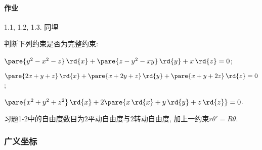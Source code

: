 \documentclass[../LectureNotes.tex]{subfiles}
\begin{document}

\paragraph{作业} %
\label{par:作业}

1.1, 1.2, 1.3. 同埋
\begin{ex}
    判断下列约束是否为完整约束:
    \begin{cenum}
        \item $\pare{y^2-x^2-z}\,\rd{x} + \pare{z-y^2-xy}\,\rd{y} + x\,\rd{z} = 0$;
        \item $\pare{2x + y + z} \,\rd{x} + \pare{x+2y+z}\,\rd{y} + \pare{x+y+2z}\,\rd{z} = 0$;
        \item $\pare{x^2+y^2+z^2}\,\rd{x} + 2\pare{x\,\rd{x} + y\,\rd{y} + z\,\rd{z}} = 0$.
    \end{cenum}
\end{ex}
\begin{remark}
    习题1-2中的自由度数目为$2$平动自由度与$2$转动自由度, 加上一约束$r{\theta}' = R\theta$.
\end{remark}


\subsubsection{广义坐标} %
\label{ssub:广义坐标}
\end{document}
